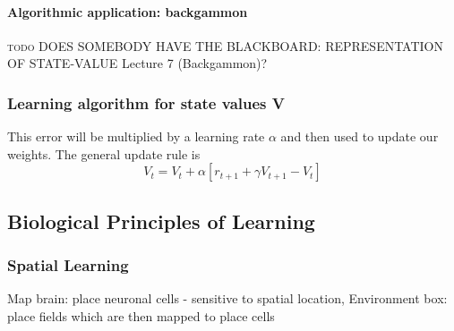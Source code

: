 \documentclass[11pt]{article}
\begin{document}
\paragraph{Algorithmic application: backgammon}
\textsc{todo}
DOES SOMEBODY HAVE THE BLACKBOARD: REPRESENTATION OF STATE-VALUE Lecture 7 (Backgammon)?

\subsubsection{Learning algorithm for state values V}
This error will be multiplied by a learning rate $\alpha$ and then used to update our weights. The general update rule is
\[
V_t = V_t + \alpha\left[r_{t+1}+\gamma V_{t+1}-V_t\right]
\]

\subsection{Biological Principles of Learning}
\subsubsection{Spatial Learning}
Map brain: place neuronal cells - sensitive to spatial location, Environment box: place fields which are then mapped to place cells
\end{document}
